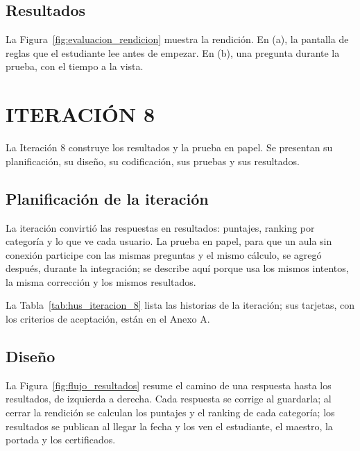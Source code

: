 \subsection{Resultados}

La Figura~\ref{fig:evaluacion_rendicion} muestra la rendición. En (a), la pantalla de reglas que el estudiante lee antes de empezar. En (b), una pregunta durante la prueba, con el tiempo a la vista.


\section{ITERACIÓN 8}

La Iteración 8 construye los resultados y la prueba en papel. Se presentan su planificación, su diseño, su codificación, sus pruebas y sus resultados.

\subsection{Planificación de la iteración}

La iteración convirtió las respuestas en resultados: puntajes, ranking por categoría y lo que ve cada usuario. La prueba en papel, para que un aula sin conexión participe con las mismas preguntas y el mismo cálculo, se agregó después, durante la integración; se describe aquí porque usa los mismos intentos, la misma corrección y los mismos resultados.

La Tabla~\ref{tab:hus_iteracion_8} lista las historias de la iteración; sus tarjetas, con los criterios de aceptación, están en el Anexo A.



\subsection{Diseño}

La Figura~\ref{fig:flujo_resultados} resume el camino de una respuesta hasta los resultados, de izquierda a derecha. Cada respuesta se corrige al guardarla; al cerrar la rendición se calculan los puntajes y el ranking de cada categoría; los resultados se publican al llegar la fecha y los ven el estudiante, el maestro, la portada y los certificados.

